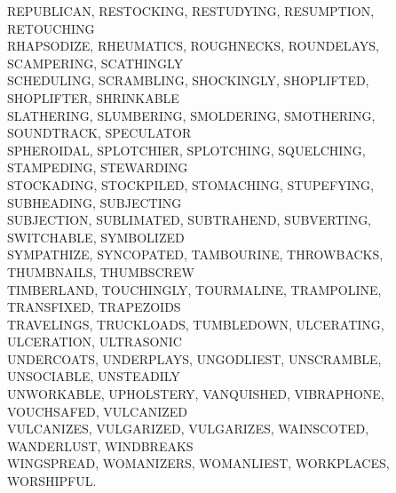 REPUBLICAN, RESTOCKING, RESTUDYING, RESUMPTION, RETOUCHING\\RHAPSODIZE, RHEUMATICS, ROUGHNECKS, ROUNDELAYS, SCAMPERING, SCATHINGLY\\SCHEDULING, SCRAMBLING, SHOCKINGLY, SHOPLIFTED, SHOPLIFTER, SHRINKABLE\\SLATHERING, SLUMBERING, SMOLDERING, SMOTHERING, SOUNDTRACK, SPECULATOR\\SPHEROIDAL, SPLOTCHIER, SPLOTCHING, SQUELCHING, STAMPEDING, STEWARDING\\STOCKADING, STOCKPILED, STOMACHING, STUPEFYING, SUBHEADING, SUBJECTING\\SUBJECTION, SUBLIMATED, SUBTRAHEND, SUBVERTING, SWITCHABLE, SYMBOLIZED\\SYMPATHIZE, SYNCOPATED, TAMBOURINE, THROWBACKS, THUMBNAILS, THUMBSCREW\\TIMBERLAND, TOUCHINGLY, TOURMALINE, TRAMPOLINE, TRANSFIXED, TRAPEZOIDS\\TRAVELINGS, TRUCKLOADS, TUMBLEDOWN, ULCERATING, ULCERATION, ULTRASONIC\\UNDERCOATS, UNDERPLAYS, UNGODLIEST, UNSCRAMBLE, UNSOCIABLE, UNSTEADILY\\UNWORKABLE, UPHOLSTERY, VANQUISHED, VIBRAPHONE, VOUCHSAFED, VULCANIZED\\VULCANIZES, VULGARIZED, VULGARIZES, WAINSCOTED, WANDERLUST, WINDBREAKS\\WINGSPREAD, WOMANIZERS, WOMANLIEST, WORKPLACES, WORSHIPFUL.\\